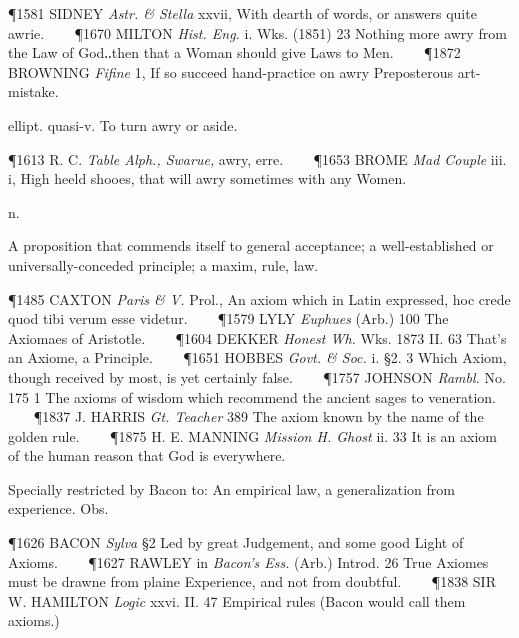 \begin{description}[wide, labelwidth=!, labelindent=0pt]
\begin{myenumerate}
\P 1581 SIDNEY  \textit{Astr. \& Stella} xxvii, With dearth of words, or answers quite awrie.    
\P 1670 MILTON  \textit{Hist. Eng.} i. Wks. (1851) 23 Nothing more awry from the Law of God‥then that a Woman should give Laws to Men.    
\P 1872 BROWNING  \textit{Fifine} 1, If so succeed hand-practice on awry Preposterous art-mistake.

 ellipt. quasi-v. To turn awry or aside.

\P 1613 R. C. \textit{Table Alph., Swarue,} awry, erre.    
\P 1653 BROME  \textit{Mad Couple} iii. i, High heeld shooes, that will awry sometimes with any Women.
\end{myenumerate}


 n.

\noindent {}

\vspace{-0.3cm}

\begin{myenumerate}

 A proposition that commends itself to general acceptance; a well-established or universally-conceded principle; a maxim, rule, law.

\P 1485 CAXTON  \textit{Paris \& V.} Prol., An axiom which in Latin expressed, hoc crede quod tibi verum esse videtur.    
\P 1579 LYLY  \textit{Euphues} (Arb.) 100 The Axiomaes of Aristotle.    
\P 1604 DEKKER  \textit{Honest Wh.} Wks. 1873 II. 63 That's an Axiome, a Principle.    
\P 1651 HOBBES  \textit{Govt. \& Soc.} i. §2. 3 Which Axiom, though received by most, is yet certainly false.    
\P 1757 JOHNSON  \textit{Rambl.} No. 175 1 The axioms of wisdom which recommend the ancient sages to veneration.    
\P 1837 J. HARRIS  \textit{Gt. Teacher} 389 The axiom known by the name of the golden rule.    
\P 1875 H. E. MANNING  \textit{Mission H. Ghost} ii. 33 It is an axiom of the human reason that God is everywhere.

 Specially restricted by Bacon to: An empirical law, a generalization from experience. Obs.

\P 1626 BACON  \textit{Sylva} §2 Led by great Judgement, and some good Light of Axioms.    
\P 1627 RAWLEY in \textit{Bacon's Ess.} (Arb.) Introd. 26 True Axiomes must be drawne from plaine Experience, and not from doubtful.    
\P 1838 SIR W. HAMILTON  \textit{Logic} xxvi. II. 47 Empirical rules (Bacon would call them axioms.)


\end{myenumerate}
\end{description}
